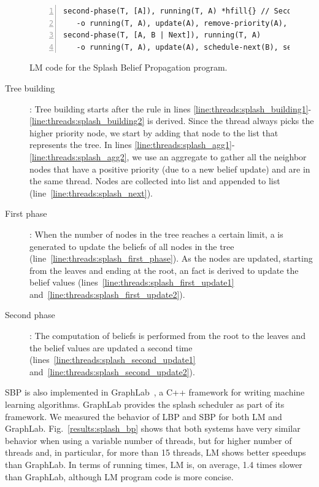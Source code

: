 \begin{figure}[!htb]
\begin{Verbatim}[numbers=left,commandchars=*\{\},fontsize=\codesize]
second-phase(T, [A]), running(T, A) *hfill{} // Second phase
   -o running(T, A), update(A), remove-priority(A), start-tree(T).*label{line:threads:splash_second_update1}
second-phase(T, [A, B | Next]), running(T, A)
   -o running(T, A), update(A), schedule-next(B), second-phase(T, [B | Next]).*label{line:threads:splash_second_update2}
\end{Verbatim}

   \caption{LM code for the Splash Belief Propagation program.}
  \label{code:threads:sbp}
\end{figure}

\begin{description}

   \item[Tree building]: Tree building starts after the rule in lines
      \ref{line:threads:splash_building1}-\ref{line:threads:splash_building2} is
      derived. Since the thread always picks the higher priority node, we start by
      adding that node to the list that represents the tree. In lines
      \ref{line:threads:splash_agg1}-\ref{line:threads:splash_agg2}, we use an
      aggregate to gather all the neighbor nodes that have a positive priority
      (due to a new belief update) and are in the same thread. Nodes are
      collected into list  and appended to list 
      (line~\ref{line:threads:splash_next}).

   \item[First phase]: When the number of nodes in the tree reaches a certain
      limit, a  is generated to update the beliefs of all
      nodes in the tree (line~\ref{line:threads:splash_first_phase}). As the
      nodes are updated, starting from the leaves and ending at the root, an
       fact is derived to update the belief values
      (lines~\ref{line:threads:splash_first_update1}
      and~\ref{line:threads:splash_first_update2}).

   \item[Second phase]: The computation of beliefs is performed from the root to
      the leaves and the belief values are updated a second time
      (lines~\ref{line:threads:splash_second_update1}
      and~\ref{line:threads:splash_second_update2}).

\end{description}

SBP is also implemented in GraphLab~\cite{GraphLab2010}, a C++ framework for
writing machine learning algorithms. GraphLab provides the splash scheduler as
part of its framework. We measured the behavior of LBP and SBP for both LM and
GraphLab. Fig.~\ref{results:splash_bp} shows that both systems have very similar
behavior when using a variable number of threads, but for higher number of
threads and, in particular, for more than 15 threads, LM shows better speedups
than GraphLab. In terms of running times, LM is, on average, 1.4 times slower
than GraphLab, although LM program code is more concise.
